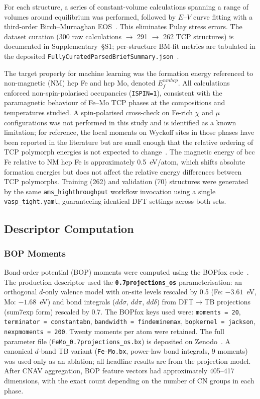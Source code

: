 For each structure, a series of constant-volume calculations spanning a range of volumes around equilibrium was performed, followed by $E$--$V$ curve fitting with a third-order Birch--Murnaghan EOS~\cite{birch_murnaghan}. This eliminates Pulay stress errors. The dataset curation (300 raw calculations $\to$ 291 $\to$ 262 TCP structures) is documented in Supplementary~\S S1; per-structure BM-fit metrics are tabulated in the deposited \texttt{FullyCuratedParsedBriefSummary.json}~\cite{zenodo}.

The target property for machine learning was the formation energy referenced to non-magnetic (NM) hcp Fe and hcp Mo, denoted $E_f^{nmhcp}$. All calculations enforced non-spin-polarised occupancies (\texttt{ISPIN=1}), consistent with the paramagnetic behaviour of Fe--Mo TCP phases at the compositions and temperatures studied. A spin-polarised cross-check on Fe-rich $\chi$ and $\mu$ configurations was not performed in this study and is identified as a known limitation; for reference, the local moments on Wyckoff sites in those phases have been reported in the literature but are small enough that the relative ordering of TCP polymorph energies is not expected to change~\cite{smith_tcp}. The magnetic energy of bcc Fe relative to NM hcp Fe is approximately 0.5~eV/atom, which shifts absolute formation energies but does not affect the relative energy differences between TCP polymorphs. Training (262) and validation (70) structures were generated by the same \texttt{ams\_highthroughput} workflow invocation using a single \texttt{vasp\_tight.yaml}, guaranteeing identical DFT settings across both sets.

\subsection{Descriptor Computation}

\subsubsection*{BOP Moments}

Bond-order potential (BOP) moments were computed using the BOPfox code~\cite{bopfox}. The production descriptor used the \textbf{\texttt{0.7projections\_os}} parameterisation: an orthogonal $d$-only valence model with on-site levels rescaled by 0.5 (Fe: $-3.61$~eV, Mo: $-1.68$~eV) and bond integrals ($dd\sigma$, $dd\pi$, $dd\delta$) from DFT$\to$TB projections (sum7exp form) rescaled by 0.7. The BOPfox keys used were: \texttt{moments~=~20}, \texttt{terminator~=~constantabn}, \texttt{bandwidth~=~findeminemax}, \texttt{bopkernel~=~jackson}, \texttt{nexpmoments~=~200}. Twenty moments per atom were retained. The full parameter file (\texttt{FeMo\_0.7projections\_os.bx}) is deposited on Zenodo~\cite{zenodo}. A canonical $d$-band TB variant (\texttt{Fe-Mo.bx}, power-law bond integrals, 9 moments) was used only as an ablation; all headline results are from the projection model. After CNAV aggregation, BOP feature vectors had approximately 405--417 dimensions, with the exact count depending on the number of CN groups in each phase.

